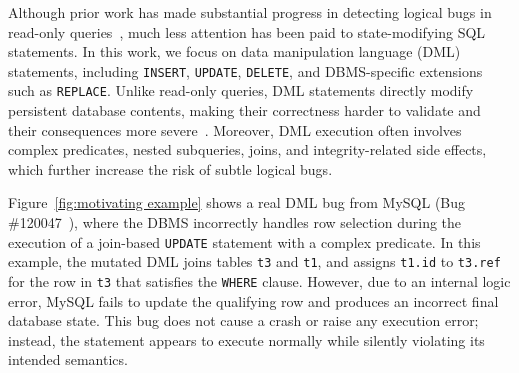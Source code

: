 Although prior work has made substantial progress in detecting logical bugs in read-only queries~\cite{rigger2020detecting,rigger2020finding,rigger2020testing,song2023testing,tang2023detecting,jiang2024detecting,song2024detecting,hao2023pinolo,deng2025detecting}, much less attention has been paid to state-modifying SQL statements. 
In this work, we focus on data manipulation language (DML) statements, including \texttt{INSERT}, \texttt{UPDATE}, \texttt{DELETE}, and DBMS-specific extensions such as \texttt{REPLACE}. 
Unlike read-only queries, DML statements directly modify persistent database contents, making their correctness harder to validate and their consequences more severe~\cite{song2023testing}. 
Moreover, DML execution often involves complex predicates, nested subqueries, joins, and integrity-related side effects, which further increase the risk of subtle logical bugs. 

Figure~\ref{fig:motivating example} shows a real DML bug from MySQL (Bug \#120047~\cite{mysql_bug_120047}), where the DBMS incorrectly handles row selection during the execution of a join-based \texttt{UPDATE} statement with a complex predicate. 
In this example, the mutated DML joins tables \texttt{t3} and \texttt{t1}, and assigns \texttt{t1.id} to \texttt{t3.ref} for the row in \texttt{t3} that satisfies the \texttt{WHERE} clause. 
However, due to an internal logic error, MySQL fails to update the qualifying row and produces an incorrect final database state. 
This bug does not cause a crash or raise any execution error; instead, the statement appears to execute normally while silently violating its intended semantics. 

